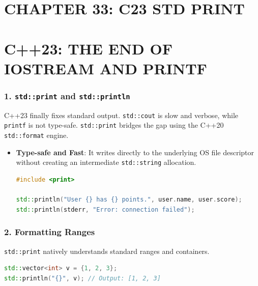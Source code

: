 \hypertarget{chapter-33-c23-std-print}{%
\section{CHAPTER 33: C23 STD PRINT}\label{chapter-33-c23-std-print}}

\hypertarget{c23-the-end-of-iostream-and-printf}{%
\section{C++23: THE END OF IOSTREAM AND
PRINTF}\label{c23-the-end-of-iostream-and-printf}}

\hypertarget{stdprint-and-stdprintln}{%
\subsubsection{\texorpdfstring{1. \texttt{std::print} and
\texttt{std::println}}{1. std::print and std::println}}\label{stdprint-and-stdprintln}}

C++23 finally fixes standard output. \passthrough{\lstinline!std::cout!}
is slow and verbose, while \passthrough{\lstinline!printf!} is not
type-safe. \passthrough{\lstinline!std::print!} bridges the gap using
the C++20 \passthrough{\lstinline!std::format!} engine.

\begin{itemize}
\item
  \textbf{Type-safe and Fast}: It writes directly to the underlying OS
  file descriptor without creating an intermediate
  \passthrough{\lstinline!std::string!} allocation.

\begin{lstlisting}[language={C++}]
#include <print>

std::println("User {} has {} points.", user.name, user.score);
std::println(stderr, "Error: connection failed");
\end{lstlisting}
\end{itemize}

\hypertarget{formatting-ranges}{%
\subsubsection{2. Formatting Ranges}\label{formatting-ranges}}

\passthrough{\lstinline!std::print!} natively understands standard
ranges and containers.

\begin{lstlisting}[language={C++}]
std::vector<int> v = {1, 2, 3};
std::println("{}", v); // Output: [1, 2, 3]
\end{lstlisting}
